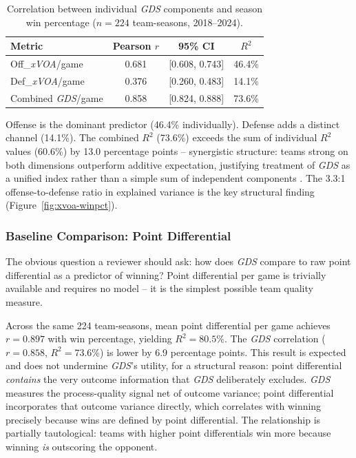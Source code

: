 \documentclass[12pt,a4paper]{article}
\newcommand{\xvoa}{\textit{xVOA}}
\newcommand{\gds}{\textit{GDS}}
\begin{document}
\begin{table}[htbp]
  \centering
  \caption{Correlation between individual \gds{} components and season win percentage ($n = 224$ team-seasons, 2018--2024).}
  \label{tab:components}
  \begin{tabular}{lccc}
    \toprule
    \textbf{Metric} & \textbf{Pearson $r$} & \textbf{95\% CI} & \textbf{$R^2$} \\
    \midrule
    Off\_\xvoa{}/game  & 0.681 & [0.608, 0.743] & 46.4\% \\
    Def\_\xvoa{}/game  & 0.376 & [0.260, 0.483] & 14.1\% \\
    Combined \gds{}/game & 0.858 & [0.824, 0.888] & 73.6\% \\
    \bottomrule
  \end{tabular}
\end{table}

Offense is the dominant predictor (46.4\% individually). Defense adds a distinct channel (14.1\%). The combined $R^2$ (73.6\%) exceeds the sum of individual $R^2$ values (60.6\%) by 13.0 percentage points -- synergistic structure: teams strong on both dimensions outperform additive expectation, justifying treatment of \gds{} as a unified index rather than a simple sum of independent components \citep{robst2011defense}. The 3.3:1 offense-to-defense ratio in explained variance is the key structural finding (Figure~\ref{fig:xvoa-winpct}).

\subsubsection{Baseline Comparison: Point Differential}

The obvious question a reviewer should ask: how does \gds{} compare to raw point differential as a predictor of winning? Point differential per game is trivially available and requires no model -- it is the simplest possible team quality measure.

Across the same 224 team-seasons, mean point differential per game achieves $r = 0.897$ with win percentage, yielding $R^2 = 80.5\%$. The \gds{} correlation ($r = 0.858$, $R^2 = 73.6\%$) is lower by 6.9 percentage points. This result is expected and does not undermine \gds{}'s utility, for a structural reason: point differential \emph{contains} the very outcome information that \gds{} deliberately excludes. \gds{} measures the process-quality signal net of outcome variance; point differential incorporates that outcome variance directly, which correlates with winning precisely because wins are defined by point differential. The relationship is partially tautological: teams with higher point differentials win more because winning \emph{is} outscoring the opponent.
\end{document}
